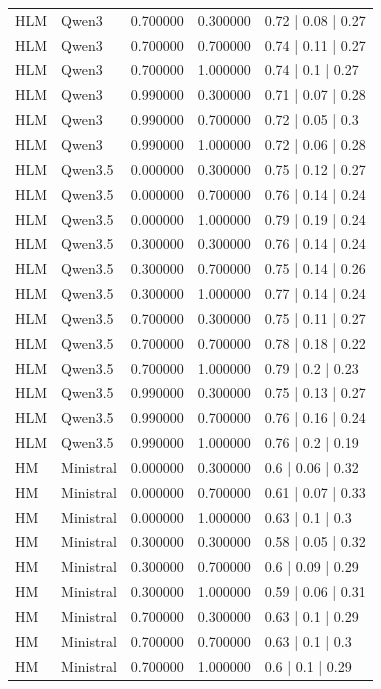 \begin{longtable}{lllll}
HLM & Qwen3 & 0.700000 & 0.300000 & 0.72 | 0.08 | 0.27 \\
HLM & Qwen3 & 0.700000 & 0.700000 & 0.74 | 0.11 | 0.27 \\
HLM & Qwen3 & 0.700000 & 1.000000 & 0.74 | 0.1 | 0.27 \\
HLM & Qwen3 & 0.990000 & 0.300000 & 0.71 | 0.07 | 0.28 \\
HLM & Qwen3 & 0.990000 & 0.700000 & 0.72 | 0.05 | 0.3 \\
HLM & Qwen3 & 0.990000 & 1.000000 & 0.72 | 0.06 | 0.28 \\
HLM & Qwen3.5 & 0.000000 & 0.300000 & 0.75 | 0.12 | 0.27 \\
HLM & Qwen3.5 & 0.000000 & 0.700000 & 0.76 | 0.14 | 0.24 \\
HLM & Qwen3.5 & 0.000000 & 1.000000 & 0.79 | 0.19 | 0.24 \\
HLM & Qwen3.5 & 0.300000 & 0.300000 & 0.76 | 0.14 | 0.24 \\
HLM & Qwen3.5 & 0.300000 & 0.700000 & 0.75 | 0.14 | 0.26 \\
HLM & Qwen3.5 & 0.300000 & 1.000000 & 0.77 | 0.14 | 0.24 \\
HLM & Qwen3.5 & 0.700000 & 0.300000 & 0.75 | 0.11 | 0.27 \\
HLM & Qwen3.5 & 0.700000 & 0.700000 & 0.78 | 0.18 | 0.22 \\
HLM & Qwen3.5 & 0.700000 & 1.000000 & 0.79 | 0.2 | 0.23 \\
HLM & Qwen3.5 & 0.990000 & 0.300000 & 0.75 | 0.13 | 0.27 \\
HLM & Qwen3.5 & 0.990000 & 0.700000 & 0.76 | 0.16 | 0.24 \\
HLM & Qwen3.5 & 0.990000 & 1.000000 & 0.76 | 0.2 | 0.19 \\
HM & Ministral & 0.000000 & 0.300000 & 0.6 | 0.06 | 0.32 \\
HM & Ministral & 0.000000 & 0.700000 & 0.61 | 0.07 | 0.33 \\
HM & Ministral & 0.000000 & 1.000000 & 0.63 | 0.1 | 0.3 \\
HM & Ministral & 0.300000 & 0.300000 & 0.58 | 0.05 | 0.32 \\
HM & Ministral & 0.300000 & 0.700000 & 0.6 | 0.09 | 0.29 \\
HM & Ministral & 0.300000 & 1.000000 & 0.59 | 0.06 | 0.31 \\
HM & Ministral & 0.700000 & 0.300000 & 0.63 | 0.1 | 0.29 \\
HM & Ministral & 0.700000 & 0.700000 & 0.63 | 0.1 | 0.3 \\
HM & Ministral & 0.700000 & 1.000000 & 0.6 | 0.1 | 0.29 \\

\end{longtable}
